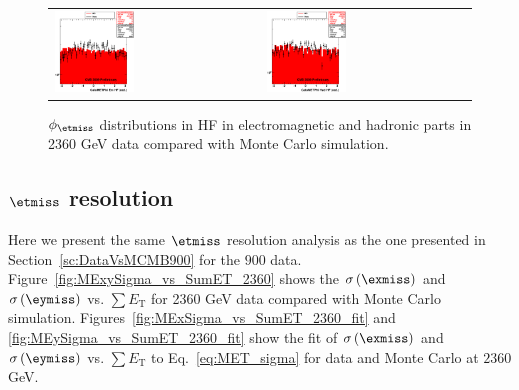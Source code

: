 \begin{figure}[h!]
 \centering
 \begin{tabular}{ll}
  \includegraphics[width=0.40\textwidth]{plots_DataVsMC_MB_2360GeV/my_calometEmHFPhi.eps} &
  \includegraphics[width=0.40\textwidth]{plots_DataVsMC_MB_2360GeV/my_calometHadHFPhi.eps} \\
 \end{tabular}
 \caption{$\phi_{\etmiss}$ distributions in HF in electromagnetic and hadronic parts in 2360 GeV data compared
   with Monte Carlo simulation.
          \label{fig:DataVsMC_MB_2360_10}}
\end{figure}

\clearpage

\subsection{$\etmiss$ resolution}

Here we present the same $\etmiss$ resolution analysis as the one presented in Section~\ref{sc:DataVsMCMB900} for the $900$ data. 
Figure~\ref{fig:MExySigma_vs_SumET_2360} shows the $\sigma\left(\exmiss\right)$ and $\sigma\left(\eymiss\right)$ 
vs. $\sum E_\text{T}$ for 2360 GeV data compared with Monte Carlo simulation. Figures~\ref{fig:MExSigma_vs_SumET_2360_fit} 
and \ref{fig:MEySigma_vs_SumET_2360_fit} show the fit of $\sigma\left(\exmiss\right)$ and $\sigma\left(\eymiss\right)$ vs. 
$\sum E_\text{T}$ to Eq.~\ref{eq:MET_sigma} for data and  Monte Carlo at $2360$ GeV.


